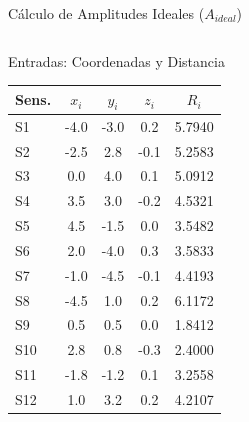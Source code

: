 

\begin{frame}{Cálculo de Amplitudes Ideales ($A_{ideal}$)}

    \begin{columns}[T]
        \begin{block}{Entradas: Coordenadas y Distancia}
            \centering
            \scriptsize 
            \begin{tabular}{@{}lcccc@{}}
                \toprule
                \textbf{Sens.} & \textbf{$x_i$} & \textbf{$y_i$} & \textbf{$z_i$} & \textbf{$R_i$} \\ \midrule
                S1  & -4.0 & -3.0 &  0.2 & 5.7940 \\
                S2  & -2.5 &  2.8 & -0.1 & 5.2583 \\
                S3  &  0.0 &  4.0 &  0.1 & 5.0912 \\
                S4  &  3.5 &  3.0 & -0.2 & 4.5321 \\
                S5  &  4.5 & -1.5 &  0.0 & 3.5482 \\
                S6  &  2.0 & -4.0 &  0.3 & 3.5833 \\
                S7  & -1.0 & -4.5 & -0.1 & 4.4193 \\
                S8  & -4.5 &  1.0 &  0.2 & 6.1172 \\
                S9  &  0.5 &  0.5 &  0.0 & 1.8412 \\
                S10 &  2.8 &  0.8 & -0.3 & 2.4000 \\
                S11 & -1.8 & -1.2 &  0.1 & 3.2558 \\
                S12 &  1.0 &  3.2 &  0.2 & 4.2107 \\ \bottomrule
            \end{tabular}
        \end{block}


\end{columns}
\end{frame}
